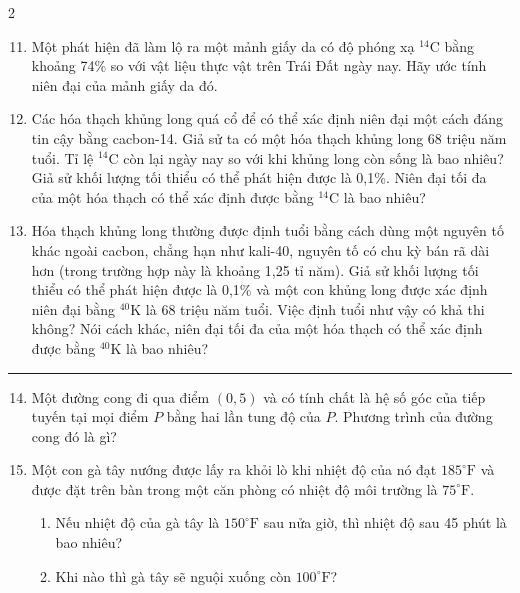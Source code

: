 \begin{paracol}{2}
\vspace{4pt}
\begin{enumerate}[label=\textbf{\arabic*.},leftmargin=*,itemsep=8pt,topsep=0pt,parsep=2pt]
  \setcounter{enumi}{10}
  \item Một phát hiện đã làm lộ ra một mảnh giấy da có độ phóng xạ $^{14}\text{C}$ bằng khoảng 74\% so với vật liệu thực vật trên Trái Đất ngày nay. Hãy ước tính niên đại của mảnh giấy da đó.

  \item Các hóa thạch khủng long quá cổ để có thể xác định niên đại một cách đáng tin cậy bằng cacbon-14. Giả sử ta có một hóa thạch khủng long 68 triệu năm tuổi. Tỉ lệ $^{14}\text{C}$ còn lại ngày nay so với khi khủng long còn sống là bao nhiêu? Giả sử khối lượng tối thiểu có thể phát hiện được là 0,1\%. Niên đại tối đa của một hóa thạch có thể xác định được bằng $^{14}\text{C}$ là bao nhiêu?

  \item Hóa thạch khủng long thường được định tuổi bằng cách dùng một nguyên tố khác ngoài cacbon, chẳng hạn như kali-40, nguyên tố có chu kỳ bán rã dài hơn (trong trường hợp này là khoảng 1,25 tỉ năm). Giả sử khối lượng tối thiểu có thể phát hiện được là 0,1\% và một con khủng long được xác định niên đại bằng $^{40}\text{K}$ là 68 triệu năm tuổi. Việc định tuổi như vậy có khả thi không? Nói cách khác, niên đại tối đa của một hóa thạch có thể xác định được bằng $^{40}\text{K}$ là bao nhiêu?
\end{enumerate}

\vspace{6pt}
\noindent\textcolor{lightrule}{\rule{\linewidth}{0.4pt}}
\vspace{4pt}

\begin{enumerate}[label=\textbf{\arabic*.},leftmargin=*,itemsep=0pt,topsep=0pt,parsep=2pt]
  \setcounter{enumi}{13}
  \item Một đường cong đi qua điểm $(0, 5)$ và có tính chất là hệ số góc của tiếp tuyến tại mọi điểm $P$ bằng hai lần tung độ của $P$. Phương trình của đường cong đó là gì?
\end{enumerate}

\switchcolumn

\begin{enumerate}[label=\textbf{\arabic*.},leftmargin=*,itemsep=9pt,topsep=0pt,parsep=2pt]
  \setcounter{enumi}{14}
  \item Một con gà tây nướng được lấy ra khỏi lò khi nhiệt độ của nó đạt $185^\circ\text{F}$ và được đặt trên bàn trong một căn phòng có nhiệt độ môi trường là $75^\circ\text{F}$.
    \begin{enumerate}[label=\textbf{(\alph*)},leftmargin=1.5em,itemsep=1.5pt,topsep=1.5pt]
      \item Nếu nhiệt độ của gà tây là $150^\circ\text{F}$ sau nửa giờ, thì nhiệt độ sau 45 phút là bao nhiêu?
      \item Khi nào thì gà tây sẽ nguội xuống còn $100^\circ\text{F}$?
    \end{enumerate}


\end{enumerate}
\end{paracol}
